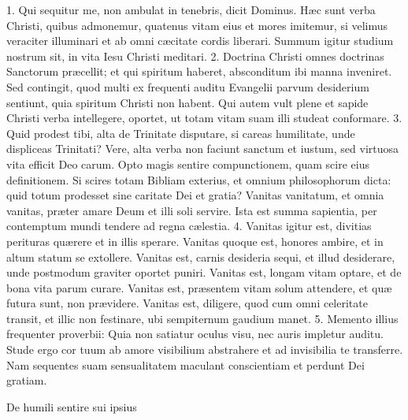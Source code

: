 




\thispagestyle{empty}





1. Qui sequitur me, non ambulat in tenebris, dicit Dominus. Hæc sunt verba Christi, quibus admonemur, quatenus vitam eius et mores imitemur, si velimus veraciter illuminari et ab omni cæcitate cordis liberari. Summum igitur studium nostrum sit, in vita Iesu Christi meditari.
2. Doctrina Christi omnes doctrinas Sanctorum præcellit; et qui spiritum haberet, absconditum ibi manna inveniret. Sed contingit, quod multi ex frequenti auditu Evangelii parvum desiderium sentiunt, quia spiritum Christi non habent. Qui autem vult plene et sapide Christi verba intellegere, oportet, ut totam vitam suam illi studeat conformare.
3. Quid prodest tibi, alta de Trinitate disputare, si careas humilitate, unde displiceas Trinitati? Vere, alta verba non faciunt sanctum et iustum, sed virtuosa vita efficit Deo carum. Opto magis sentire compunctionem, quam scire eius definitionem. Si scires totam Bibliam exterius, et omnium philosophorum dicta: quid totum prodesset sine caritate Dei et gratia? Vanitas vanitatum, et omnia vanitas, præter amare Deum et illi soli servire. Ista est summa sapientia, per contemptum mundi tendere ad regna cælestia.
4. Vanitas igitur est, divitias perituras quærere et in illis sperare. Vanitas quoque est, honores ambire, et in altum statum se extollere. Vanitas est, carnis desideria sequi, et illud desiderare, unde postmodum graviter oportet puniri. Vanitas est, longam vitam optare, et de bona vita parum curare. Vanitas est, præsentem vitam solum attendere, et quæ futura sunt, non prævidere. Vanitas est, diligere, quod cum omni celeritate transit, et illic non festinare, ubi sempiternum gaudium manet.
5. Memento illius frequenter proverbii: Quia non satiatur oculus visu, nec auris impletur auditu. Stude ergo cor tuum ab amore visibilium abstrahere et ad invisibilia te transferre. Nam sequentes suam sensualitatem maculant conscientiam et perdunt Dei gratiam.

De humili sentire sui ipsius

